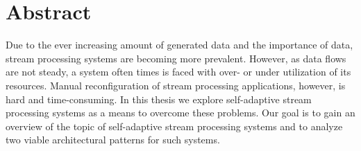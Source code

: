 


\section*{Abstract}
\label{sec:Abstract}
Due to the ever increasing amount of generated data and the importance of data, stream processing systems are becoming more prevalent.
However, as data flows are not steady, a system often times is faced with over- or under utilization of its resources. 
Manual reconfiguration of stream processing applications, however, is hard and time-consuming.
In this thesis we explore self-adaptive stream processing systems as a means to overcome these problems. 
Our goal is to gain an overview of the topic of self-adaptive stream processing systems and to analyze two viable architectural patterns for such systems.
